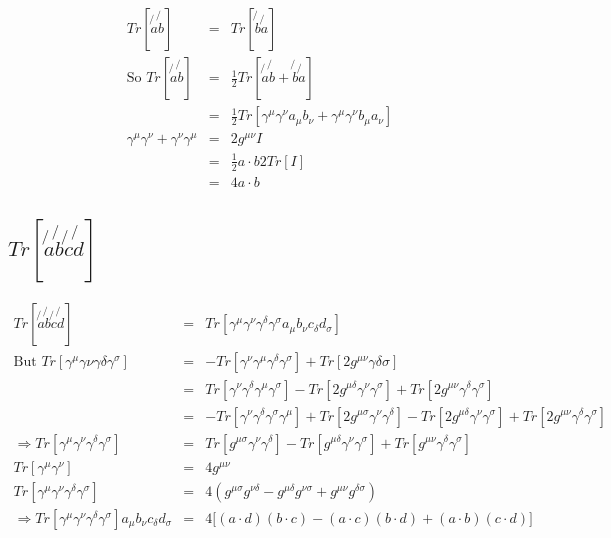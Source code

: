 \begin{eqnarray*}
  Tr[\not{a}\not{b}] & = & Tr[\not{b}\not{a}] \\
  \textrm{So } Tr[\not{a}\not{b}] & = & \frac{1}{2}Tr[\not{a}\not{b} + \not{b}\not{a}] \\
  & = & \frac{1}{2} Tr[\gamma^{\mu}\gamma^{\nu}a_{\mu}b_{\nu} + \gamma^{\mu}\gamma^{\nu}b_{\mu}a_{\nu}] \\
  \gamma^{\mu}\gamma{^\nu} + \gamma^{\nu}\gamma^{\mu} & = & 2g^{\mu\nu}I \\
  & = & \frac{1}{2}a\cdot b 2 Tr[I] \\
  & = & 4a\cdot b
\end{eqnarray*}

\subsection{\texorpdfstring{$Tr[\not{a}\not{b}\not{c}\not{d}]$}{TrNotANotBNotCNotD}}

\begin{eqnarray*}
  Tr[\not{a}\not{b}\not{c}\not{d}] & = & Tr[\gamma^{\mu}\gamma^{\nu}\gamma^{\delta}\gamma^{\sigma}a_{\mu}b_{\nu}c_{\delta}d_{\sigma}] \\
  \textrm{But } Tr[\gamma^{\mu}\gamma{\nu}\gamma{\delta}\gamma^{\sigma}] & = & - Tr[\gamma^{\nu}\gamma^{\mu}\gamma^{\delta}\gamma^{\sigma}] + Tr[2g^{\mu\nu}\gamma{\delta}{\sigma}] \\
  & = & Tr[\gamma^{\nu}\gamma^{\delta}\gamma^{\mu}\gamma^{\sigma}] - Tr[2g^{\mu\delta}\gamma^{\nu}\gamma^{\sigma}] + Tr[2g^{\mu\nu}\gamma^{\delta}\gamma^{\sigma}] \\
  & = & -Tr[\gamma^{\nu}\gamma^{\delta}\gamma^{\sigma}\gamma^{\mu}] + Tr[2g^{\mu\sigma}\gamma^{\nu}\gamma^{\delta}] - Tr[2g^{\mu\delta}\gamma^{\nu}\gamma^{\sigma}] + Tr[2g^{\mu\nu}\gamma^{\delta}\gamma^{\sigma}] \\
  \Rightarrow Tr[\gamma^{\mu}\gamma^{\nu}\gamma^{\delta}\gamma^{\sigma}] & = & Tr[g^{\mu\sigma}\gamma^{\nu}\gamma^{\delta}] - Tr[g^{\mu\delta}\gamma^{\nu}\gamma^{\sigma}] + Tr[g^{\mu\nu}\gamma^{\delta}\gamma^{\sigma}] \\
  Tr[\gamma^{\mu}\gamma^{\nu}] & = & 4g^{\mu\nu} \\
  Tr[\gamma^{\mu}\gamma^{\nu}\gamma^{\delta}\gamma^{\sigma}] & = & 4\left(g^{\mu\sigma}g^{\nu\delta} - g^{\mu\delta}g^{\nu\sigma} + g^{\mu\nu}g^{\delta\sigma} \right) \\
  \Rightarrow Tr[\gamma^{\mu}\gamma^{\nu}\gamma^{\delta}\gamma^{\sigma}]a_{\mu}b_{\nu}c_{\delta}d_{\sigma} & = & 4\Big[ (a\cdot d)(b\cdot c) - (a\cdot c)(b\cdot d) + (a\cdot b)(c\cdot d)\Big]
\end{eqnarray*}


